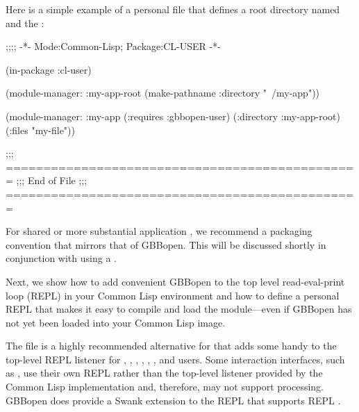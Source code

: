 \documentclass[10pt,twoside,english,pdftex]{article}
\begin{document}
Here is a simple example of a personal
 file that defines a root
directory named  and the 
:
%
\W\supp
\begin{example}
  ;;;; -*- Mode:Common-Lisp; Package:CL-USER -*-

  (in-package :cl-user)

  (module-manager: :my-app-root 
      (make-pathname :directory "~/my-app"))    

  (module-manager: :my-app
    (:requires :gbbopen-user)
    (:directory :my-app-root)
    (:files "my-file"))

  ;;; ===============================================
  ;;;   End of File
  ;;; ===============================================
\end{example}

For shared or more substantial application , we recommend a
packaging convention that mirrors that of GBBopen.  This will be discussed
shortly in conjunction with using a .

Next, we show how to add convenient GBBopen  to the
top level read-eval-print loop (REPL) in your Common Lisp environment and how
to define a personal REPL  that makes it easy to compile and
load the  module---even if GBBopen has not yet been
loaded into your Common Lisp image.

%
%
%
The file  is a highly
recommended alternative for
 that adds some handy
 to the top-level REPL listener for
%
,
,
,
,
,
, and
%
users.  Some interaction interfaces, such as
, use their own REPL
rather than the top-level listener provided by the Common Lisp implementation
and, therefore, may not support  
processing.  GBBopen does provide a Swank extension to the
 REPL that supports
REPL .
\end{document}
